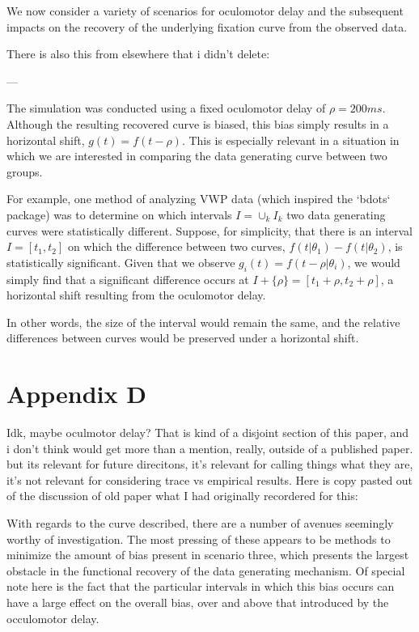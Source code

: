 \documentclass{article}
\begin{document}
We now consider a variety of scenarios for oculomotor delay and the subsequent impacts on the recovery of the underlying fixation curve from the observed data.

There is also this from elsewhere that i didn't delete:

---

The simulation was conducted using a fixed oculomotor delay of $\rho = 200ms$. Although the resulting recovered curve is biased, this bias simply results in a horizontal shift, $g(t) = f(t - \rho)$. This is especially relevant in a situation in which we are interested in comparing the data generating curve between two groups. 

For example, one method of analyzing VWP data (which inspired the `bdots` package) was to determine on which intervals $I = \cup_{k} I_k$ two data generating curves were statistically different. Suppose, for simplicity, that there is an interval $I = [t_1, t_2]$ on which the difference between two curves, $f(t | \theta_1) - f(t|\theta_2)$, is statistically significant. Given that we observe $g_i(t) = f(t - \rho | \theta_i)$, we would simply find that a significant difference occurs at $I + \{\rho\} = [t_1 + \rho, t_2 + \rho]$, a horizontal shift resulting from the oculomotor delay.

In other words, the size of the interval would remain the same, and the relative differences between curves would be preserved under a horizontal shift. 

\section*{Appendix D}

Idk, maybe oculmotor delay? That is kind of a disjoint section of this paper, and i don't think would get more than a mention, really, outside of a published paper. but its relevant for future direcitons, it's relevant for calling things what they are, it's not relevant for considering trace vs empirical results. Here is copy pasted out of the discussion of old paper what I had originally recordered for this:

With regards to the curve described, there are a number of avenues seemingly worthy of investigation. The most pressing of these appears to be methods to minimize the amount of bias present in scenario three, which presents the largest obstacle in the functional recovery of the data generating mechanism. Of special note here is the fact that the particular intervals in which this bias occurs can have a large effect on the overall bias, over and above that introduced by the occulomotor delay. 
\end{document}
